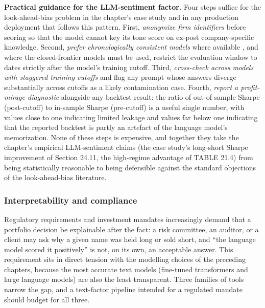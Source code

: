 \textbf{Practical guidance for the LLM-sentiment factor.} Four steps suffice for the look-ahead-bias problem in the chapter's case study and in any production deployment that follows this pattern. First, \textit{anonymize firm identifiers} before scoring \citep{glasserman2023lookahead} so that the model cannot key its tone score on ex-post company-specific knowledge. Second, \textit{prefer chronologically consistent models} where available \citep{he2025chronologically}, and where the closed-frontier models must be used, restrict the evaluation window to dates strictly after the model's training cutoff. Third, \textit{cross-check across models with staggered training cutoffs} \citep{roy2026memguard} and flag any prompt whose answers diverge substantially across cutoffs as a likely contamination case. Fourth, \textit{report a profit-mirage diagnostic} alongside any backtest result: the ratio of out-of-sample Sharpe (post-cutoff) to in-sample Sharpe (pre-cutoff) is a useful single number, with values close to one indicating limited leakage and values far below one indicating that the reported backtest is partly an artefact of the language model's memorization. None of these steps is expensive, and together they take the chapter's empirical LLM-sentiment claims (the case study's long-short Sharpe improvement of Section 24.11, the high-regime advantage of TABLE 21.4) from being statistically reasonable to being defensible against the standard objections of the look-ahead-bias literature.

\subsubsection{Interpretability and compliance}

Regulatory requirements and investment mandates increasingly demand that a portfolio decision be explainable after the fact: a risk committee, an auditor, or a client may ask why a given name was held long or sold short, and ``the language model scored it positively'' is not, on its own, an acceptable answer. This requirement sits in direct tension with the modelling choices of the preceding chapters, because the most accurate text models (fine-tuned transformers and large language models) are also the least transparent. Three families of tools narrow the gap, and a text-factor pipeline intended for a regulated mandate should budget for all three.

